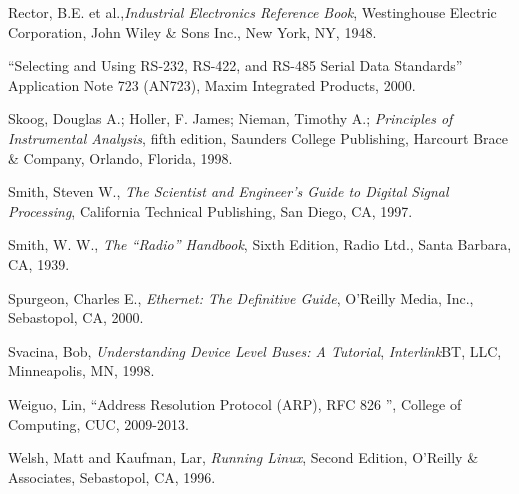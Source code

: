 \vskip 10pt

\noindent
Rector, B.E. et al.,\textit{Industrial Electronics Reference Book}, Westinghouse Electric Corporation, John Wiley \& Sons Inc., New York, NY, 1948. 

\vskip 10pt

\noindent
``Selecting and Using RS-232, RS-422, and RS-485 Serial Data Standards'' Application Note 723 (AN723), Maxim Integrated Products, 2000. 

\vskip 10pt

\noindent
Skoog, Douglas A.; Holler, F. James; Nieman, Timothy A.; \textit{Principles of Instrumental Analysis}, fifth edition, Saunders College Publishing, Harcourt Brace \& Company, Orlando, Florida, 1998.

\vskip 10pt

\noindent
Smith, Steven W., \textit{The Scientist and Engineer's Guide to Digital Signal Processing}, California Technical Publishing, San Diego, CA, 1997.

\vskip 10pt

\noindent
Smith, W. W., \textit{The ``Radio'' Handbook}, Sixth Edition, Radio Ltd., Santa Barbara, CA, 1939.

\vskip 10pt

\noindent
Spurgeon, Charles E., \textit{Ethernet: The Definitive Guide}, O'Reilly Media, Inc., Sebastopol, CA, 2000.

\vskip 10pt

\noindent
Svacina, Bob, \textit{Understanding Device Level Buses: A Tutorial}, \textit{Interlink}BT, LLC, Minneapolis, MN, 1998.

\vskip 10pt

\noindent
Weiguo, Lin, ``Address Resolution Protocol (ARP), RFC 826 '', College of Computing, CUC, 2009-2013.

\vskip 10pt

\noindent
Welsh, Matt and Kaufman, Lar, \textit{Running Linux}, Second Edition, O'Reilly \& Associates, Sebastopol, CA, 1996.

















